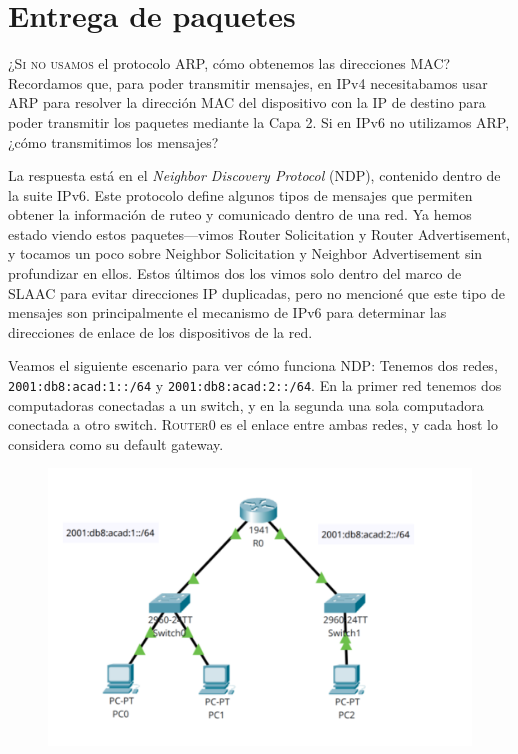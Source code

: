 \documentclass[a4paper,10pt]{corsage}
\newcommand{\ipaddress}[1]{\texttt{#1}}
\newcommand{\devname}[1]{\textsc{#1}}
\begin{document}
\renewcommand{\scenarioheight}{16\baselineskip}
\chapter{Entrega de paquetes}
	\lettrine[lraise=0.25]{¿S}{i no usamos} el protocolo ARP, cómo obtenemos las direcciones MAC?  Recordamos que, para poder transmitir mensajes, en IPv4 necesitabamos usar ARP para resolver la dirección MAC del dispositivo con la IP de destino para poder transmitir los paquetes mediante la Capa 2.  Si en IPv6 no utilizamos ARP, ¿cómo transmitimos los mensajes?

	La respuesta está en el \textit{Neighbor Discovery Protocol} (NDP), contenido dentro de la suite IPv6.  Este protocolo define algunos tipos de mensajes que permiten obtener la información de ruteo y comunicado dentro de una red.  Ya hemos estado viendo estos paquetes---vimos Router Solicitation y Router Advertisement, y tocamos un poco sobre Neighbor Solicitation y Neighbor Advertisement sin profundizar en ellos.  Estos últimos dos los vimos solo dentro del marco de SLAAC para evitar direcciones IP duplicadas, pero no mencioné que este tipo de mensajes son principalmente el mecanismo de IPv6 para determinar las direcciones de enlace de los dispositivos de la red.

	Veamos el siguiente escenario para ver cómo funciona NDP:  Tenemos dos redes, \ipaddress{2001:db8:acad:1::/64} y \ipaddress{2001:db8:acad:2::/64}.  En la primer red tenemos dos computadoras conectadas a un switch, y en la segunda una sola computadora conectada a otro switch.  \devname{Router0} es el enlace entre ambas redes, y cada host lo considera como su default gateway.
	\begin{figure}[h]
		\centering
		\includegraphics[height=\scenarioheight]{nd-quiet}
	\end{figure}
\end{document}
